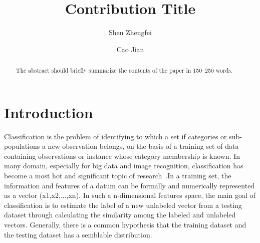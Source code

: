 \documentclass[runningheads]{llncs}
\begin{document}
%
\title{Contribution Title}
%
%
\author{Shen Zhengfei \and
Cao Jian }
%
%
%
\maketitle              %
%
\begin{abstract}
The abstract should briefly summarize the contents of the paper in
150--250 words.

\end{abstract}
%
%
%
\section{Introduction}
Classification is the problem of identifying to which a set if categories or sub-populations a new observation belongs, on the basis of a training set of data containing observations or instance whose category membership is known. In many domain, especially for big data and image recognition, classification has become a most hot and significant topic of research~\cite{ref_article1}.In a training set, the information and features of a datum can be formally and numerically represented as a vector (x1,x2,...,xn). In such a n-dimensional features space, the main goal of classification is to estimate the label of a new unlabeled vector from a testing dataset through calculating the similarity among the labeled and unlabeled vectors. Generally, there is a common hypothesis that the training dataset and the testing dataset has a semblable distribution. 
\end{document}
